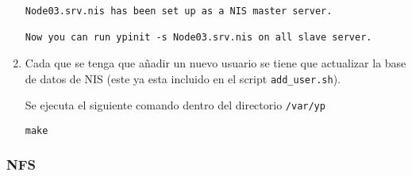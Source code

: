 \documentclass[../main.tex]{subfiles}
\begin{document}
\begin{enumerate}
  \begin{lstlisting}
Node03.srv.nis has been set up as a NIS master server.

Now you can run ypinit -s Node03.srv.nis on all slave server.
\end{lstlisting}
  
\item Cada que se tenga  que añadir un nuevo usuario se
  tiene que actualizar la base de datos de NIS\@
  (este ya esta incluido en el script \lstinline|add_user.sh|).

  Se ejecuta el siguiente comando dentro del directorio
  \lstinline|/var/yp|

  \begin{lstlisting}
make
\end{lstlisting}
  
\end{enumerate}

\subsubsection{NFS}\label{sec:nfs}
\end{document}

